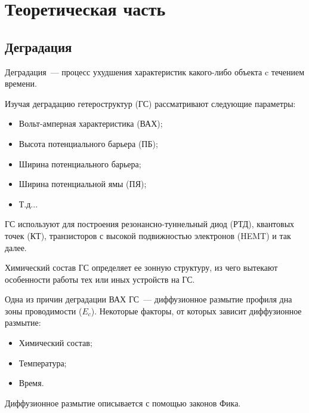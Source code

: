 \chapter{Теоретическая часть}
\section{Деградация}
Деградация~--- процесс ухудшения характеристик какого-либо объекта c течением времени.

Изучая деградацию гетероструктур (ГС) рассматривают следующие параметры:
\begin{itemize}
	\item Вольт-амперная характеристика (ВАХ);
	\item Высота потенциального барьера (ПБ);
	\item Ширина потенциального барьера;
	\item Ширина потенциальной ямы (ПЯ);
	\item Т.д...
\end{itemize}

ГС используют для построения резонансно-туннельный диод (РТД), квантовых точек (КТ), транзисторов с высокой подвижностью электронов (HEMT) и так далее. 

Химический состав ГС определяет ее зонную структуру, из чего вытекают особенности работы тех или иных устройств на ГС.

Одна из причин деградации ВАХ ГС~--- диффузионное размытие профиля дна зоны проводимости ($E_{c}$). Некоторые факторы, от которых зависит диффузионное размытие:
\begin{itemize}
	\item Химический состав; 
	\item Температура; 
	\item Время. 
\end{itemize}

Диффузионное размытие описывается с помощью законов Фика.



